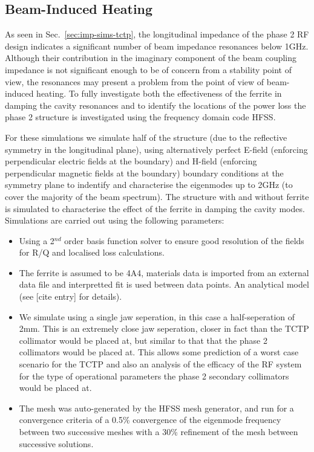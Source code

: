 \subsection{Beam-Induced Heating}
\label{sec:beam-heating-tctp}

As seen in Sec.~\ref{sec:imp-sims-tctp}, the longitudinal impedance of the phase 2 RF design indicates a significant number of beam impedance resonances below 1GHz. Although their contribution in the imaginary component of the beam coupling impedance is not significant enough to be of concern from a stability point of view, the resonances may present a problem from the point of view of beam-induced heating. To fully investigate both the effectiveness of the ferrite in damping the cavity resonances and to identify the locations of the power loss the phase 2 structure is investigated using the frequency domain code HFSS. 

For these simulations we simulate half of the structure (due to the reflective symmetry in the longitudinal plane), using alternatively perfect E-field (enforcing perpendicular electric fields at the boundary) and H-field (enforcing perpendicular magnetic fields at the boundary) boundary conditions at the symmetry plane to indentify and characterise the eigenmodes up to 2GHz (to cover the majority of the beam spectrum). The structure with and without ferrite is simulated to characterise the effect of the ferrite in damping the cavity modes. Simulations are carried out using the following parameters:

\begin{itemize}
\item{Using a 2$^{nd}$ order basis function solver to ensure good resolution of the fields for R/Q and localised loss calculations.}
\item{The ferrite is assumed to be 4A4, materials data is imported from an external data file and interpretted fit is used between data points. An analytical model (see [cite entry] for details).}
\item{We simulate using a single jaw seperation, in this case a half-seperation of 2mm. This is an extremely close jaw seperation, closer in fact than the TCTP collimator would be placed at, but similar to that that the phase 2 collimators would be placed at. This allows some prediction of a worst case scenario for the TCTP and also an analysis of the efficacy of the RF system for the type of operational parameters the phase 2 secondary collimators would be placed at.}
\item{The mesh was auto-generated by the HFSS mesh generator, and run for a convergence criteria of a 0.5\% convergence of the eigenmode frequency between two successive meshes with a 30\% refinement of the mesh between successive solutions.}
\end{itemize}


